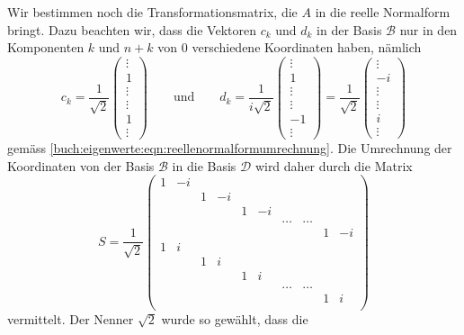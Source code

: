 Wir bestimmen noch die Transformationsmatrix, die $A$ in die reelle
Normalform bringt.
Dazu beachten wir, dass die Vektoren $c_k$ und $d_k$ in der Basis
$\mathcal{B}$ nur in den Komponenten $k$ und $n+k$ von $0$ verschiedene
Koordinaten haben, nämlich
\[
c_k
=
\frac1{\sqrt{2}}
\left(
\begin{array}{c}
\vdots\\ 1 \\ \vdots\\\hline \vdots\\ 1\\\vdots
\end{array}\right)
\qquad\text{und}\qquad
d_k
=
\frac1{i\sqrt{2}}
\left(\begin{array}{c}
\vdots\\ 1 \\ \vdots\\\hline\vdots\\-1\\\vdots
\end{array}\right)
=
\frac1{\sqrt{2}}
\left(\begin{array}{c}
\vdots\\-i \\ \vdots\\\hline \vdots\\ i\\\vdots
\end{array}\right)
\]
gemäss \eqref{buch:eigenwerte:eqn:reellenormalformumrechnung}.
Die Umrechnung der Koordinaten von der Basis $\mathcal{B}$ in die Basis
$\mathcal{D}$
wird daher durch die Matrix
\[
S
=
\frac{1}{\sqrt{2}}
\left(\begin{array}{cccccccccc}
1&-i& &  & &  &     &     & &  \\
 &  &1&-i& &  &     &     & &  \\
 &  & &  &1&-i&     &     & &  \\
 &  & &  & &  &\dots&\dots& &  \\
 &  & &  & &  &     &     &1&-i\\
\hline
1& i& &  & &  &     &     & &  \\
 &  &1& i& &  &     &     & &  \\
 &  & &  &1& i&     &     & &  \\
 &  & &  & &  &\dots&\dots& &  \\
 &  & &  & &  &     &     &1& i\\
\end{array}\right)
\]
vermittelt.
Der Nenner $\sqrt{2}$ wurde so gewählt, dass die
